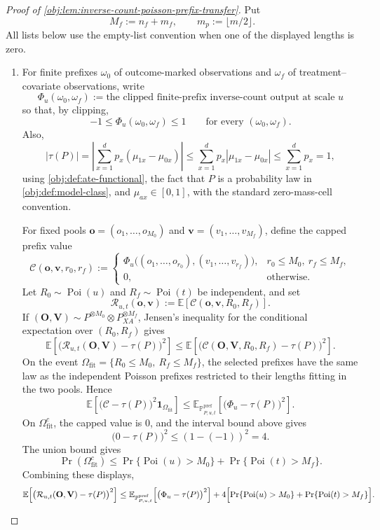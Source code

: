 \begin{proof}[Proof of \cref{obj:lem:inverse-count-poisson-prefix-transfer}]
Put
\[
M_f:=n_f+m_f,\qquad m_p:=\lfloor m/2\rfloor .
\]
All lists below use the empty-list convention when one of the displayed lengths is zero.

\begin{enumerate}
\item
For finite prefixes \(\omega_0\) of outcome-marked observations and \(\omega_f\) of treatment--covariate observations, write
\[
\Phi_u(\omega_0,\omega_f)
:=
\text{the clipped finite-prefix inverse-count output at scale }u
\]
so that, by clipping,
\[
-1\le \Phi_u(\omega_0,\omega_f)\le 1
\qquad\text{for every }(\omega_0,\omega_f).
\]
Also,
\[
|\tau(P)|
=
\left|\sum_{x=1}^{d}p_x(\mu_{1x}-\mu_{0x})\right|
\le
\sum_{x=1}^{d}p_x|\mu_{1x}-\mu_{0x}|
\le
\sum_{x=1}^{d}p_x
=1,
\]
using \cref{obj:def:ate-functional}, the fact that \(P\) is a probability law in \cref{obj:def:model-class}, and \(\mu_{ax}\in[0,1]\), with the standard zero-mass-cell convention.

For fixed pools \(\mathbf o=(o_1,\ldots,o_{M_0})\) and \(\mathbf v=(v_1,\ldots,v_{M_f})\), define the capped prefix value
\[
\mathcal C(\mathbf o,\mathbf v,r_0,r_f)
:=
\begin{cases}
\Phi_u\bigl((o_1,\ldots,o_{r_0}),(v_1,\ldots,v_{r_f})\bigr),
& r_0\le M_0,\ r_f\le M_f,\\
0,&\text{otherwise}.
\end{cases}
\]
Let \(R_0\sim\operatorname{Poi}(u)\) and \(R_f\sim\operatorname{Poi}(t)\) be independent, and set
\[
\mathcal R_{u,t}(\mathbf o,\mathbf v)
:=
\mathbb E\!\left[\mathcal C(\mathbf o,\mathbf v,R_0,R_f)\right].
\]
If \((\mathbf O,\mathbf V)\sim P^{\otimes M_0}\otimes P_{XA}^{\otimes M_f}\), Jensen's inequality for the conditional expectation over \((R_0,R_f)\) gives
\[
\mathbb E\!\left[
  \bigl(\mathcal R_{u,t}(\mathbf O,\mathbf V)-\tau(P)\bigr)^2
\right]
\le
\mathbb E\!\left[
  \bigl(\mathcal C(\mathbf O,\mathbf V,R_0,R_f)-\tau(P)\bigr)^2
\right].
\]
On the event \(\Omega_{\mathrm{fit}}=\{R_0\le M_0,\ R_f\le M_f\}\), the selected prefixes have the same law as the independent Poisson prefixes restricted to their lengths fitting in the two pools. Hence
\[
\mathbb E\!\left[
  \bigl(\mathcal C-\tau(P)\bigr)^2\mathbf 1_{\Omega_{\mathrm{fit}}}
\right]
\le
\mathbb E_{\mathbb P^{\mathrm{pref}}_{P,u,t}}\!\left[
  \bigl(\Phi_u-\tau(P)\bigr)^2
\right].
\]
On \(\Omega_{\mathrm{fit}}^c\), the capped value is \(0\), and the interval bound above gives
\[
\bigl(0-\tau(P)\bigr)^2\le (1-(-1))^2=4.
\]
The union bound gives
\[
\Pr(\Omega_{\mathrm{fit}}^c)
\le
\Pr\{\operatorname{Poi}(u)>M_0\}
+
\Pr\{\operatorname{Poi}(t)>M_f\}.
\]
Combining these displays,
\[
\mathbb E\!\left[
  \bigl(\mathcal R_{u,t}(\mathbf O,\mathbf V)-\tau(P)\bigr)^2
\right]
\le
\mathbb E_{\mathbb P^{\mathrm{pref}}_{P,u,t}}\!\left[
  \bigl(\Phi_u-\tau(P)\bigr)^2
\right]
+4\Bigl[
  \Pr\{\operatorname{Poi}(u)>M_0\}
  +
  \Pr\{\operatorname{Poi}(t)>M_f\}
\Bigr].
\]


\end{enumerate}
\end{proof}
